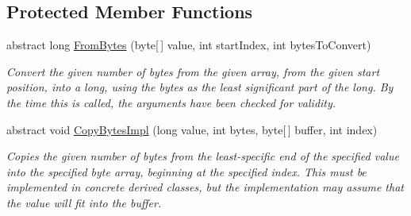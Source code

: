 \subsection*{Protected Member Functions}
\begin{DoxyCompactItemize}
\item 
abstract long \mbox{\hyperlink{class_t_net_1_1_i_o_1_1_endian_bit_converter_a20baa5cfe592893363ad0574639a3002}{From\+Bytes}} (byte\mbox{[}$\,$\mbox{]} value, int start\+Index, int bytes\+To\+Convert)
\begin{DoxyCompactList}\small\item\em Convert the given number of bytes from the given array, from the given start position, into a long, using the bytes as the least significant part of the long. By the time this is called, the arguments have been checked for validity. \end{DoxyCompactList}\item 
abstract void \mbox{\hyperlink{class_t_net_1_1_i_o_1_1_endian_bit_converter_aee6cc9a29f052fc97acc51eef906e600}{Copy\+Bytes\+Impl}} (long value, int bytes, byte\mbox{[}$\,$\mbox{]} buffer, int index)
\begin{DoxyCompactList}\small\item\em Copies the given number of bytes from the least-\/specific end of the specified value into the specified byte array, beginning at the specified index. This must be implemented in concrete derived classes, but the implementation may assume that the value will fit into the buffer. \end{DoxyCompactList}\end{DoxyCompactItemize}
